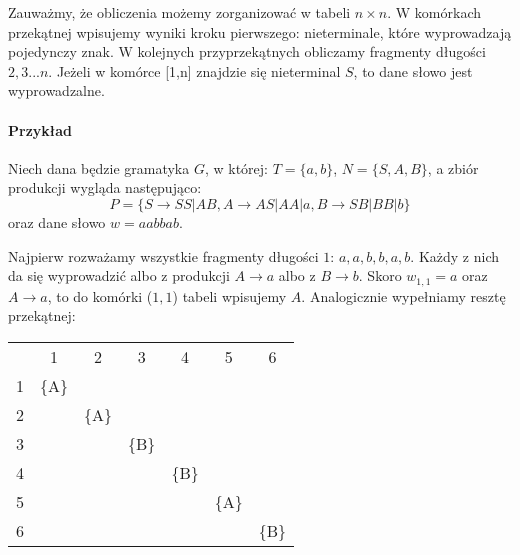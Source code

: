 Zauważmy, że obliczenia możemy zorganizować w tabeli $n \times n$.
W komórkach przekątnej wpisujemy wyniki kroku pierwszego: nieterminale, które wyprowadzają pojedynczy znak.
W kolejnych przyprzekątnych obliczamy fragmenty długości $2,3...n$.
Jeżeli w komórce [1,n] znajdzie się nieterminal $S$, to dane słowo jest wyprowadzalne.

\paragraph{Przykład}
Niech dana będzie  gramatyka $G$, w której: $T = \{a,b\}$, $N = \{S, A, B\}$, a zbiór produkcji wygląda następująco:
\[
	P = \{S\rightarrow SS|AB, A\rightarrow AS|AA|a, B\rightarrow SB|BB|b \}
\]
oraz dane słowo $w = aabbab$.

Najpierw rozważamy wszystkie fragmenty długości $1$: $a,a,b,b,a,b$. 
Każdy z nich da się wyprowadzić albo z produkcji $A\rightarrow a$ albo z $B\rightarrow b$. 
Skoro $w_{1,1}=a$ oraz $A \rightarrow a$, to do komórki ($1,1$) tabeli wpisujemy $A$. Analogicznie wypełniamy resztę przekątnej:
\begin{table}[h]
\centering
\label{my-label}
\begin{tabular}{ccccccc}
                       & 1                          & 2                          & 3                          & 4                          & 5                          & 6                          \\ \cline{2-7} 
\multicolumn{1}{l|}{1} & \multicolumn{1}{l|}{\{A\}} & \multicolumn{1}{l|}{}      & \multicolumn{1}{l|}{}      & \multicolumn{1}{l|}{}      & \multicolumn{1}{l|}{}      & \multicolumn{1}{l|}{}      \\ \cline{2-7} 
\multicolumn{1}{l|}{2} & \multicolumn{1}{l|}{}      & \multicolumn{1}{l|}{\{A\}} & \multicolumn{1}{l|}{}      & \multicolumn{1}{l|}{}      & \multicolumn{1}{l|}{}      & \multicolumn{1}{l|}{}      \\ \cline{2-7} 
\multicolumn{1}{l|}{3} & \multicolumn{1}{l|}{}      & \multicolumn{1}{l|}{}      & \multicolumn{1}{l|}{\{B\}} & \multicolumn{1}{l|}{}      & \multicolumn{1}{l|}{}      & \multicolumn{1}{l|}{}      \\ \cline{2-7} 
\multicolumn{1}{l|}{4} & \multicolumn{1}{l|}{}      & \multicolumn{1}{l|}{}      & \multicolumn{1}{l|}{}      & \multicolumn{1}{l|}{\{B\}} & \multicolumn{1}{l|}{}      & \multicolumn{1}{l|}{}      \\ \cline{2-7} 
\multicolumn{1}{l|}{5} & \multicolumn{1}{l|}{}      & \multicolumn{1}{l|}{}      & \multicolumn{1}{l|}{}      & \multicolumn{1}{l|}{}      & \multicolumn{1}{l|}{\{A\}} & \multicolumn{1}{l|}{}      \\ \cline{2-7} 
\multicolumn{1}{l|}{6} & \multicolumn{1}{l|}{}      & \multicolumn{1}{l|}{}      & \multicolumn{1}{l|}{}      & \multicolumn{1}{l|}{}      & \multicolumn{1}{l|}{}      & \multicolumn{1}{l|}{\{B\}} \\ \cline{2-7} 
\end{tabular}
\end{table}

